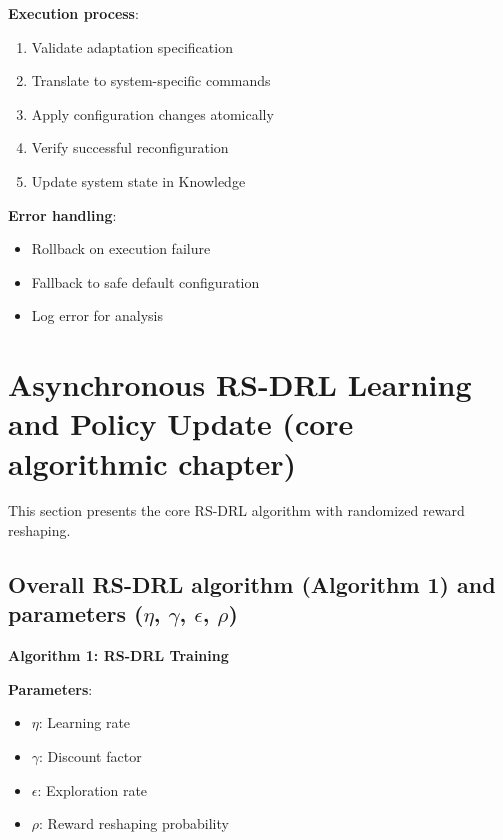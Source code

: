 \documentclass[11pt,a4paper]{article}
\begin{document}
\textbf{Execution process}:
\begin{enumerate}
    \item Validate adaptation specification
    \item Translate to system-specific commands
    \item Apply configuration changes atomically
    \item Verify successful reconfiguration
    \item Update system state in Knowledge
\end{enumerate}

\textbf{Error handling}:
\begin{itemize}
    \item Rollback on execution failure
    \item Fallback to safe default configuration
    \item Log error for analysis
\end{itemize}

\section{Asynchronous RS-DRL Learning and Policy Update (core algorithmic chapter)}

This section presents the core RS-DRL algorithm with randomized reward reshaping.

\subsection{Overall RS-DRL algorithm (Algorithm 1) and parameters ($\eta$, $\gamma$, $\epsilon$, $\rho$)}

\textbf{Algorithm 1: RS-DRL Training}

\textbf{Parameters}:
\begin{itemize}
    \item $\eta$: Learning rate
    \item $\gamma$: Discount factor
    \item $\epsilon$: Exploration rate
    \item $\rho$: Reward reshaping probability
\end{itemize}
\end{document}
